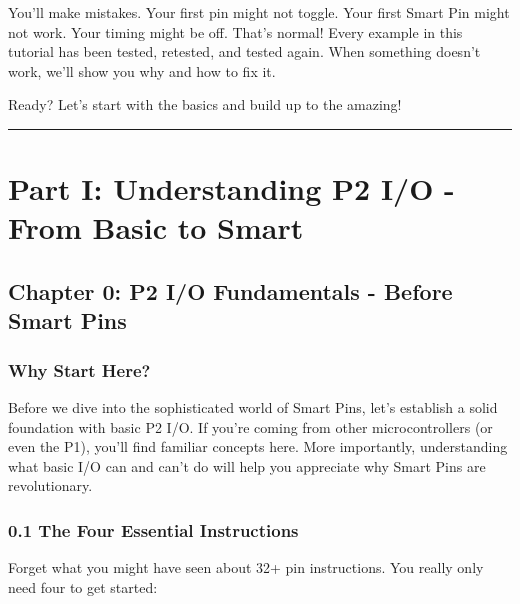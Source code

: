 \documentclass[11pt,a4paper,oneside,english]{book}
\begin{document}
You'll make mistakes. Your first pin might not toggle. Your first Smart
Pin might not work. Your timing might be off. That's normal! Every
example in this tutorial has been tested, retested, and tested again.
When something doesn't work, we'll show you why and how to fix it.

Ready? Let's start with the basics and build up to the amazing!

\begin{center}\rule{0.5\linewidth}{0.5pt}\end{center}

\clearpage

\clearpage

\hypertarget{part-i-understanding-p2-io---from-basic-to-smart}{%
\part{Part I: Understanding P2 I/O - From Basic to
Smart}\label{part-i-understanding-p2-io---from-basic-to-smart}}

\hypertarget{chapter-0-p2-io-fundamentals---before-smart-pins}{%
\chapter{Chapter 0: P2 I/O Fundamentals - Before Smart
Pins}\label{chapter-0-p2-io-fundamentals---before-smart-pins}}

\hypertarget{why-start-here}{%
\section{Why Start Here?}\label{why-start-here}}

Before we dive into the sophisticated world of Smart Pins, let's
establish a solid foundation with basic P2 I/O. If you're coming from
other microcontrollers (or even the P1), you'll find familiar concepts
here. More importantly, understanding what basic I/O can and can't do
will help you appreciate why Smart Pins are revolutionary.

\hypertarget{the-four-essential-instructions}{%
\section{0.1 The Four Essential
Instructions}\label{the-four-essential-instructions}}

Forget what you might have seen about 32+ pin instructions. You really
only need four to get started:
\end{document}
